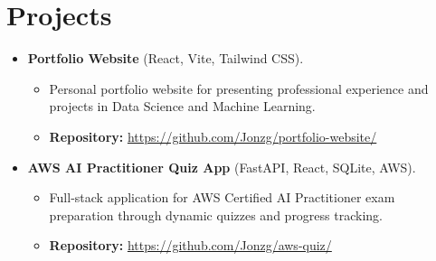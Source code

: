 
\section{Projects}

\vspace{1em}



\begin{itemize}
    \item \textbf{Portfolio Website} (React, Vite, Tailwind CSS).
    \begin{itemize}
        \item Personal portfolio website for presenting professional experience and projects in Data Science and Machine Learning.
        \item \textbf{Repository:} \url{https://github.com/Jonzg/portfolio-website/}
    \end{itemize}
    \item \textbf{AWS AI Practitioner Quiz App} (FastAPI, React, SQLite, AWS).
    \begin{itemize}
        \item Full-stack application for AWS Certified AI Practitioner exam preparation through dynamic quizzes and progress tracking.
        \item \textbf{Repository:} \url{https://github.com/Jonzg/aws-quiz/}
    \end{itemize}
\end{itemize}

